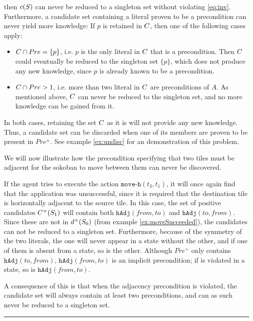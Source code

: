 \documentclass[\master/Master.tex]{subfiles}
\begin{document}
then $c(S)$ can never be reduced to a singleton set without violating \eqref{eq:inv}. Furthermore, a candidate set \Cand containing a literal proven to be a precondition can never yield more knowledge: If $p$ is retained in $C$, then one of the following cases apply:
\begin{itemize}
    \item $C \cap Pre = \{ p \}$, i.e. $p$ is the only literal in $C$ that is a precondition. Then $C$ could eventually be reduced to the singleton set $\{ p \}$, which does not produce any new knowledge, since $p$ is already known to be a precondition.

    \item $C \cap Pre > 1$, i.e. more than two literal in $C$ are preconditions of $A$. As mentioned above, $C$ can never be reduced to the singleton set, and no more knowledge can be gained from it.
\end{itemize}
In both cases, retaining the set $C$ as it is will not provide any new knowledge. Thus, a candidate set can be discarded when one of its members are proven to be present in $Pre^{\pm}$. See example \ref{ex:undisc} for an demonstration of this problem.

\begin{example} \label{ex:undisc}
    We will now illustrate how the precondition specifying that two tiles must be adjacent for the sokoban to move between them can never be discovered.

    If the agent tries to execute the action $\texttt{move-h}(t_3, t_1)$, it will once again find that the application was unsuccessful, since it is required that the destination tile is horizontally adjacent to the source tile. In this case, the set of positive candidates $C^+(S_1)$ will contain both $\texttt{hAdj}(from, to)$ and $\texttt{hAdj}(to, from)$. Since these are not in $d^+(S_0)$ (from example \ref{ex:moveSucceeded}), the candidates can not be reduced to a singleton set. Furthermore, because of the symmetry of the two literals, the one will never appear in a state without the other, and if one of them is absent from a state, so is the other. Although $Pre^+$ only contains $\texttt{hAdj}(to, from)$, $\texttt{hAdj}(from, to)$ is an implicit precondition; if is violated in a state, so is $\texttt{hAdj}(from, to)$.

    A consequence of this is that when the adjacency precondition is violated, the candidate set will always contain at least two preconditions, and can as such never be reduced to a singleton set.

    \noindent\rule{\textwidth}{1pt}
\end{example}
\end{document}
